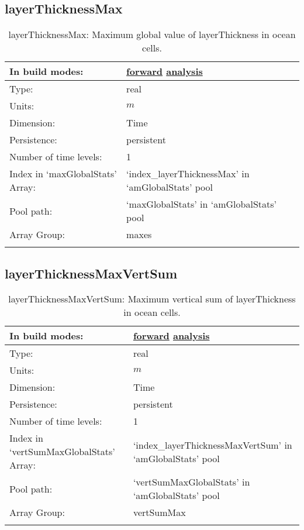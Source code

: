 \subsection[layerThicknessMax]{layerThicknessMax}
\label{subsec:var_sec_amGlobalStats_layerThicknessMax}
\begin{center}
\begin{longtable}{| p{2.0in} | p{4.0in} |}
        \hline 
        In build modes: & \hyperref[subsec:forward_var_tab_amGlobalStats]{forward} \hyperref[subsec:analysis_var_tab_amGlobalStats]{analysis} \\
        \hline 
        Type: & real \\
        \hline 
        Units: & $m$ \\
        \hline 
        Dimension: & Time \\
        \hline 
        Persistence: & persistent \\
        \hline 
        Number of time levels: & 1 \\
        \hline 
		 Index in `maxGlobalStats' Array: & `index\_layerThicknessMax' in `amGlobalStats' pool \\
		 \hline 
            Pool path: & `maxGlobalStats' in `amGlobalStats' pool \\
		 \hline 
		 Array Group: & maxes \\
		 \hline 
    \caption{layerThicknessMax: Maximum global value of layerThickness in ocean cells.}
\end{longtable}
\end{center}
\subsection[layerThicknessMaxVertSum]{layerThicknessMaxVertSum}
\label{subsec:var_sec_amGlobalStats_layerThicknessMaxVertSum}
\begin{center}
\begin{longtable}{| p{2.0in} | p{4.0in} |}
        \hline 
        In build modes: & \hyperref[subsec:forward_var_tab_amGlobalStats]{forward} \hyperref[subsec:analysis_var_tab_amGlobalStats]{analysis} \\
        \hline 
        Type: & real \\
        \hline 
        Units: & $m$ \\
        \hline 
        Dimension: & Time \\
        \hline 
        Persistence: & persistent \\
        \hline 
        Number of time levels: & 1 \\
        \hline 
		 Index in `vertSumMaxGlobalStats' Array: & `index\_layerThicknessMaxVertSum' in `amGlobalStats' pool \\
		 \hline 
            Pool path: & `vertSumMaxGlobalStats' in `amGlobalStats' pool \\
		 \hline 
		 Array Group: & vertSumMax \\
		 \hline 
    \caption{layerThicknessMaxVertSum: Maximum vertical sum of layerThickness in ocean cells.}
\end{longtable}
\end{center}
